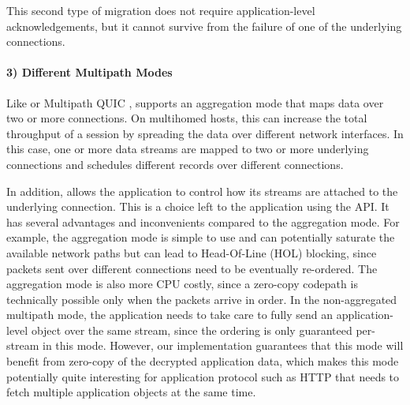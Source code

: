This second type of migration does not require application-level
acknowledgements, but it cannot survive from the failure of one of the
underlying connections.



\paragraph*{3) Different Multipath Modes}
Like \mptcp \cite{raiciu2012hard,rfc6824} or Multipath QUIC \cite{viernickel2018multipath,de2017multipath,draft-deconinck-quic-multipath-06,draft-liu-multipath-quic-02}, \tcpls supports an aggregation mode that maps data over two or more \tcp connections. On multihomed hosts, this can increase the total throughput of a \tcpls session by spreading the data over different network interfaces. In this case, one or more data streams are mapped to two or more underlying \tcp
connections and \tcpls schedules different records over different connections.

In addition, \tcpls allows the application to control how its streams are
attached to the underlying \tcp connection. 
This is a choice left to the application using the API. It has several
advantages and inconvenients compared to the aggregation mode. For example, the
aggregation mode is simple to use and can potentially saturate the available
network paths but can lead to Head-Of-Line (HOL) blocking,
since packets sent over different \tcp connections need to be eventually
re-ordered. The aggregation mode is also more CPU
costly, since a zero-copy codepath is technically possible only when the packets
arrive in order. In the non-aggregated multipath mode, the application needs to
take care to fully send an application-level object over the same stream, since
the ordering is only guaranteed per-stream in this mode. However, our \tcpls
implementation guarantees that this mode will benefit from zero-copy of the decrypted application data, which
makes this mode potentially quite interesting for application protocol such as
HTTP that needs to fetch multiple application objects at the same time.





